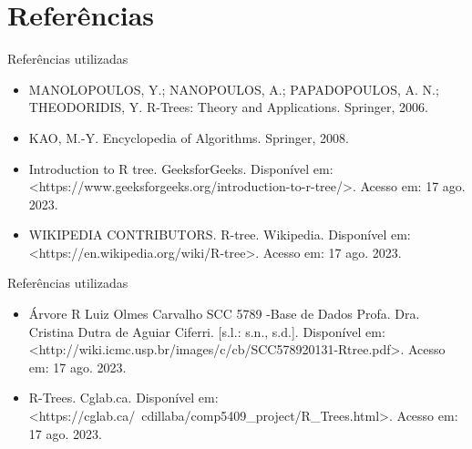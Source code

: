 \documentclass[compress,aspectratio=169]{beamer}
\begin{document}
\section{Referências}
\begin{frame}{Referências utilizadas}
    
    \begin{justify}
        \begin{itemize}
           \item MANOLOPOULOS, Y.; NANOPOULOS, A.; PAPADOPOULOS, A. N.; THEODORIDIS, Y. R-Trees: Theory and Applications. Springer, 2006. 
           \item KAO, M.-Y. Encyclopedia of Algorithms. Springer, 2008.
           \item Introduction to R tree. GeeksforGeeks. Disponível em: <https://www.geeksforgeeks.org/introduction-to-r-tree/>. Acesso em: 17 ago. 2023.
           \item WIKIPEDIA CONTRIBUTORS. R-tree. Wikipedia. Disponível em: <https://en.wikipedia.org/wiki/R-tree>. Acesso em: 17 ago. 2023.
        \end{itemize}
    \end{justify}
\end{frame}
\begin{frame}{Referências utilizadas}
    
    \begin{justify}
        \begin{itemize}
           \item Árvore R Luiz Olmes Carvalho SCC 5789 -Base de Dados Profa. Dra. Cristina Dutra de Aguiar Ciferri. [s.l.: s.n., s.d.]. Disponível em: <http://wiki.icmc.usp.br/images/c/cb/SCC578920131-Rtree.pdf>.  Acesso em: 17 ago. 2023.
           \item R-Trees. Cglab.ca. Disponível em: <https://cglab.ca/~cdillaba/comp5409\_project/R\_Trees.html>. Acesso em: 17 ago. 2023.
        \end{itemize}
    \end{justify}
\end{frame}
\end{document}

